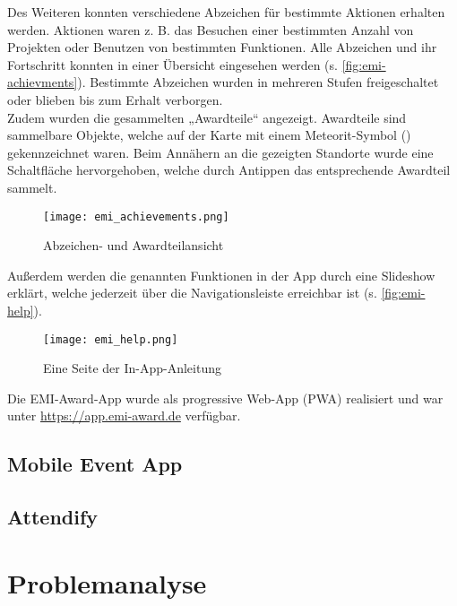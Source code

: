 Des Weiteren konnten verschiedene Abzeichen für bestimmte Aktionen erhalten
werden. Aktionen waren z. B. das Besuchen einer bestimmten Anzahl von Projekten
oder Benutzen von bestimmten Funktionen. Alle Abzeichen und ihr Fortschritt
konnten in einer Übersicht eingesehen werden (s. \autoref{fig:emi-achievments}).
Bestimmte Abzeichen wurden in mehreren Stufen freigeschaltet oder blieben bis
zum Erhalt verborgen. \\
Zudem wurden die gesammelten „Awardteile“ angezeigt. Awardteile sind sammelbare
Objekte, welche auf der Karte mit einem Meteorit-Symbol
() gekennzeichnet waren. Beim Annähern an die
gezeigten Standorte wurde eine Schaltfläche hervorgehoben, welche durch Antippen
das entsprechende Awardteil sammelt.

\begin{figure}[htpb]
    \centering
    \texttt{[image: emi\_achievements.png]}
    \caption{Abzeichen- und Awardteilansicht}
    \label{fig:emi-achievments}
\end{figure}

Außerdem werden die genannten Funktionen in der App durch eine Slideshow
erklärt, welche jederzeit über die Navigationsleiste erreichbar ist (s.
\autoref{fig:emi-help}).

\begin{figure}[htpb]
    \centering
    \texttt{[image: emi\_help.png]}
    \caption{Eine Seite der In-App-Anleitung}
    \label{fig:emi-help}
\end{figure}

Die EMI-Award-App wurde als progressive Web-App (PWA) realisiert und war unter
\url{https://app.emi-award.de} verfügbar.

\subsection{Mobile Event App}



\subsection{Attendify}



\section{Problemanalyse} \label{sec:analysis-problems}

